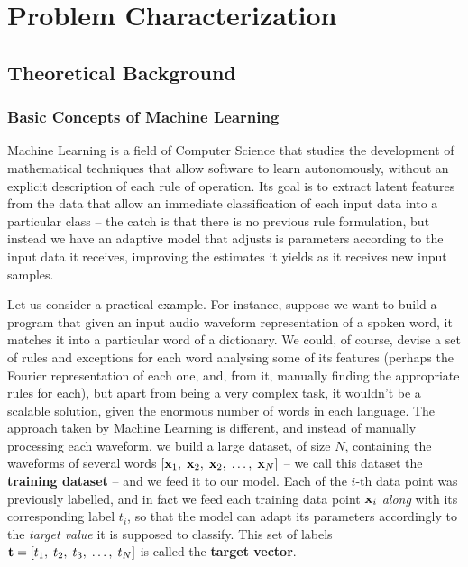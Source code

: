 \chapter{Problem Characterization}\label{chap:theorBack}

\section{Theoretical Background}\label{sec:tb}

\subsection{Basic Concepts of Machine Learning}\label{sec:tb_basicCon}
Machine Learning is a field of Computer Science that studies the development of mathematical techniques that allow software to learn autonomously, without an explicit description of each rule of operation. Its goal is to extract latent features from the data that allow an immediate classification of each input data into a particular class -- the catch is that there is no previous rule formulation, but instead we have an adaptive model that adjusts is parameters according to the input data it receives, improving the estimates it yields as it receives new input samples.

Let us consider a practical example. For instance, suppose we want to build a program that given an input audio waveform representation of a spoken word, it matches it into a particular word of a dictionary. We could, of course, devise a set of rules and exceptions for each word analysing some of its features (perhaps the Fourier representation of each one, and, from it, manually finding the appropriate rules for each), but apart from being a very complex task, it wouldn't be a scalable solution, given the enormous number of words in each language. The approach taken by Machine Learning is different, and instead of manually processing each waveform, we build a large dataset, of size $N$, containing the waveforms of several words $\left[ \mathbf{x}_1 ,\; \mathbf{x}_2 ,\;\mathbf{x}_2 ,\; \dots ,\;\mathbf{x}_N \right]$ -- we call this dataset the \textbf{training dataset} -- and we feed it to our model. Each of the $i$-th data point was previously labelled, and in fact we feed each training data point $\mathbf{x}_i$ \emph{along} with its corresponding label $t_i$, so that the model can adapt its parameters accordingly to the \emph{target value} it is supposed to classify. This set of labels $\mathbf{t} = \left[ t_1 ,\; t_2 ,\; t_3 ,\; \dots ,\; t_N \right]$ is called the \textbf{target vector}. 

